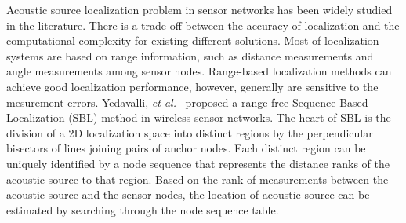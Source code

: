 Acoustic source localization problem in sensor networks has been widely studied in the literature. 
There is a trade-off between the accuracy of localization and the computational complexity for existing different solutions.
Most of localization systems are based on range information, such as distance measurements and angle measurements among sensor nodes. 
Range-based localization methods can achieve good localization performance, however, generally are sensitive to the mesurement errors\cite{zhong2009tracking}. 
Yedavalli, \emph{et al.}~\cite{yedavalli2008sequence} proposed a range-free Sequence-Based Localization (SBL) method in wireless sensor networks. 
The heart of SBL is the division of a 2D localization space into distinct regions by the perpendicular bisectors of lines joining pairs of anchor nodes.
Each distinct region can be uniquely identified by a node sequence that represents the distance ranks of the acoustic source to that region. 
Based on the rank of measurements between the acoustic source and the sensor nodes, the location of acoustic source can be estimated by searching through the node sequence table.

